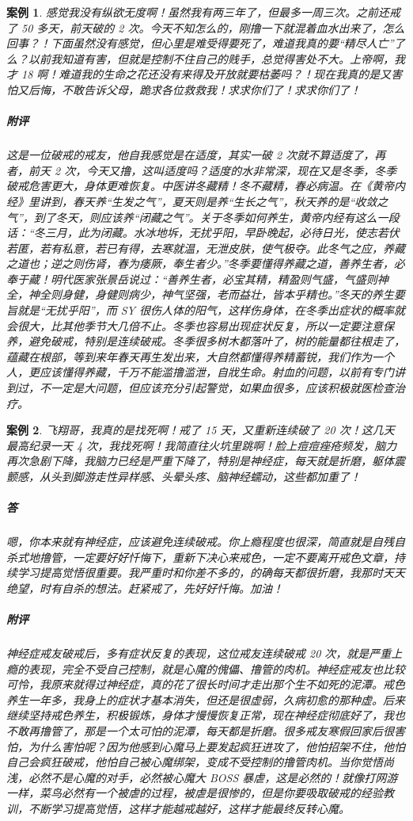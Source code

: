 \documentclass{ctexart}
\newtheorem{case}{案例}
\begin{document}
\begin{case}
    感觉我没有纵欲无度啊！虽然我有两三年了，但最多一周三次。之前还戒了 50 多天，前天破的 2 次。今天不知怎么的，刚撸一下就混着血水出来了，怎么回事？！下面虽然没有感觉，但心里是难受得要死了，难道我真的要“精尽人亡”了么？以前我知道有害，但就是控制不住自己的贱手，总觉得害处不大。上帝啊，我才 18 啊！难道我的生命之花还没有来得及开放就要枯萎吗？！现在我真的是又害怕又后悔，不敢告诉父母，跪求各位救救我！求求你们了！求求你们了！
    \subparagraph{附评} 这是一位破戒的戒友，他自我感觉是在适度，其实一破 2 次就不算适度了，再者，前天 2 次，今天又撸，这叫适度吗？适度的水非常深，现在又是冬季，冬季破戒危害更大，身体更难恢复。中医讲冬藏精！冬不藏精，春必病温。在《黄帝内经》里讲到，春天养“生发之气”，夏天则是养“生长之气”，秋天养的是“收敛之气”，到了冬天，则应该养“闭藏之气”。关于冬季如何养生，黄帝内经有这么一段话：“冬三月，此为闭藏。水冰地坼，无扰乎阳，早卧晚起，必待日光，使志若伏若匿，若有私意，若已有得，去寒就温，无泄皮肤，使气极夺。此冬气之应，养藏之道也；逆之则伤肾，春为痿厥，奉生者少。”冬季要懂得养藏之道，善养生者，必奉于藏！明代医家张景岳说过：“善养生者，必宝其精，精盈则气盛，气盛则神全，神全则身健，身健则病少，神气坚强，老而益壮，皆本乎精也。”冬天的养生要旨就是“无扰乎阳”，而 SY 很伤人体的阳气，这样伤身体，在冬季出症状的概率就会很大，比其他季节大几倍不止。冬季也容易出现症状反复，所以一定要注意保养，避免破戒，特别是连续破戒。冬季很多树木都落叶了，树的能量都往根走了，蕴藏在根部，等到来年春天再生发出来，大自然都懂得养精蓄锐，我们作为一个人，更应该懂得养藏，千万不能滥撸滥泄，自戕生命。射血的问题，以前有专门讲到过，不一定是大问题，但应该充分引起警觉，如果血很多，应该积极就医检查治疗。
\end{case}

\begin{case}
    飞翔哥，我真的是找死啊！戒了 15 天，又重新连续破了 20 次！这几天最高纪录一天 4 次，我找死啊！我简直往火坑里跳啊！脸上痘痘痤疮频发，脑力再次急剧下降，我脑力已经是严重下降了，特别是神经症，每天就是折磨，躯体震颤感，从头到脚游走性异样感、头晕头疼、脑神经蠕动，这些都加重了！
    \subparagraph{答} 嗯，你本来就有神经症，应该避免连续破戒。你上瘾程度也很深，简直就是自残自杀式地撸管，一定要好好忏悔下，重新下决心来戒色，一定不要离开戒色文章，持续学习提高觉悟很重要。我严重时和你差不多的，的确每天都很折磨，我那时天天绝望，时有自杀的想法。赶紧戒了，先好好忏悔。加油！
    \subparagraph{附评} 神经症戒友破戒后，多有症状反复的表现，这位戒友连续破戒 20 次，就是严重上瘾的表现，完全不受自己控制，就是心魔的傀儡、撸管的肉机。神经症戒友也比较可怜，我原来就得过神经症，真的花了很长时间才走出那个生不如死的泥潭。戒色养生一年多，我身上的症状才基本消失，但还是很虚弱，久病初愈的那种虚。后来继续坚持戒色养生，积极锻炼，身体才慢慢恢复正常，现在神经症彻底好了，我也不敢再撸管了，那是一个太可怕的泥潭，每天都是折磨。很多戒友寒假回家后很害怕，为什么害怕呢？因为他感到心魔马上要发起疯狂进攻了，他怕招架不住，他怕自己会疯狂破戒，他怕自己被心魔绑架，变成不受控制的撸管肉机。当你觉悟尚浅，必然不是心魔的对手，必然被心魔大 BOSS 暴虐，这是必然的！就像打网游一样，菜鸟必然有一个被虐的过程，被虐是很惨的，但是你要吸取破戒的经验教训，不断学习提高觉悟，这样才能越戒越好，这样才能最终反转心魔。
\end{case}
\end{document}
